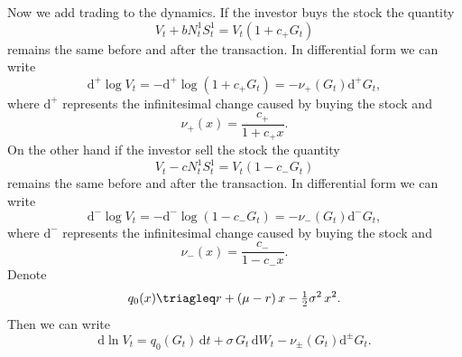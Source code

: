 Now we add trading to the dynamics. If the investor buys the stock the quantity 
\[V_t+b N^1_t S^1_t=V_t(1+c_{+} G_t)\]
remains the same before and after the transaction. In differential form we can write
\[\mathrm{d}^+ \log V_t=-\mathrm{d}^+\log(1+c_{+} G_t)=-\nu_+(G_t)\mathrm{d}^+ G_t,\]
where $\mathrm{d}^+$ represents the infinitesimal change caused by buying the stock and
\begin{equation}
\label{nuplus}
\nu_+(x)=\frac{c_{+}}{1+c_{+} x}.
\end{equation}
On the other hand if the investor sell the stock the quantity 
\[V_t-c N^1_t S^1_t=V_t(1-c_{-} G_t)\]
remains the same before and after the transaction. In differential form we can write
\[\mathrm{d}^- \log V_t=-\mathrm{d}^-\log(1-c_{-} G_t)=-\nu_-(G_t)\mathrm{d}^- G_t,\]
where $\mathrm{d}^-$ represents the infinitesimal change caused by buying the stock and
\begin{equation}
\label{numinus}
\nu_-(x)=\frac{c_{-}}{1-c_{-} x}.
\end{equation}
Denote
\[q_0(x)\triagleq r+(\mu-r)\,x-\tfrac{1}{2}\sigma^2\,x^2.\]
Then we can write
\begin{equation}
\label{Vdynamics}
\mathrm{d}\ln V_t=q_0(G_t)\,\mathrm{d}t+\sigma\,G_t\,\mathrm{d}W_t-\nu_{\pm}(G_t)\mathrm{d}^{\pm} G_t.
\end{equation}  


